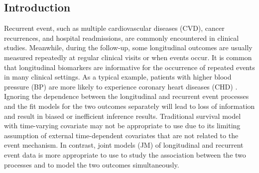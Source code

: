 





% 


\subsection{Introduction}


Recurrent event, such as multiple cardiovascular diseases (CVD), cancer recurrences, and hospital readmissions, are commonly encountered in clinical studies. Meanwhile, during the follow-up, some longitudinal outcomes are usually measured repeatedly at regular clinical visits or when events occur. It is common that longitudinal biomarkers are informative for the occurrence of repeated events in many clinical settings. As a typical example, patients with higher blood pressure (BP) are more likely to experience coronary heart diseases (CHD) \citep{wattanakit2005risk, rodriguez2014systolic}. Ignoring the dependence between the longitudinal and recurrent event processes and the fit models for the two outcomes separately will lead to loss of information and result in biased or inefficient inference results. Traditional survival model with time-varying covariate may not be appropriate to use due to its limiting assumption of external time-dependent covariates that are not related to the event mechanism. In contrast, joint models (JM) of longitudinal and recurrent event data is more appropriate to use to study the association between the two processes and to model the two outcomes simultaneously.

